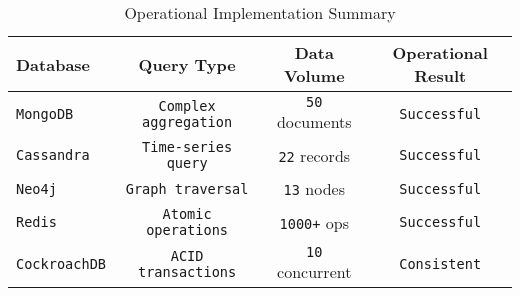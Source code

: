 \begin{table}[H]
\centering
\begin{tabular}{|l|c|c|c|}
\hline
\textbf{Database} & \textbf{Query Type} & \textbf{Data Volume} & \textbf{Operational Result} \\
\hline
\texttt{MongoDB} & \texttt{Complex aggregation} & \texttt{50} documents & \texttt{Successful} \\
\texttt{Cassandra} & \texttt{Time-series query} & \texttt{22} records & \texttt{Successful} \\
\texttt{Neo4j} & \texttt{Graph traversal} & \texttt{13} nodes & \texttt{Successful} \\
\texttt{Redis} & \texttt{Atomic operations} & \texttt{1000+} ops & \texttt{Successful} \\
\texttt{CockroachDB} & \texttt{ACID transactions} & \texttt{10} concurrent & \texttt{Consistent} \\
\hline
\end{tabular}
\caption{Operational Implementation Summary}
\label{tab:implementation-summary}
\end{table}